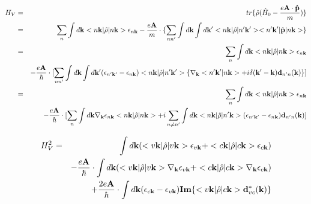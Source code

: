 \documentclass[aps,prb,preprint]{revtex4-1}
\begin{document}
\begin{appendix}
 \begin{eqnarray}
H_V &=& tr\{\hat{\rho}( \hat{H}_0 - \frac{e{\bf A \cdot \hat{p}}}{m}) \} \nonumber \\
&=& \sum_n \int d{\bf k} <n{\bf k}| \hat{\rho} |n{\bf k}> \epsilon_{n{\bf k}} - \frac{e{\bf A}}{m} \cdot \{ \sum_{nn'} \int d{\bf k} \int d{\bf k'} <n{\bf k}| \hat{\rho} |n'{\bf k'}><n'{\bf k'}| \hat{\bf p} |n{\bf k}> \} \nonumber \\
&=& \sum_n \int d{\bf k} <n{\bf k}| \hat{\rho} |n{\bf k}> \epsilon_{n{\bf k}}\nonumber  \\
&& - \frac{e{\bf A}}{\hbar} \cdot [ \sum_{nn'} \int d{\bf k} \int d{\bf k'}  (\epsilon_{n'{\bf k'}}-\epsilon_{n{\bf k}}) <n{\bf k}| \hat{\rho} |n'{\bf k'}>\{\nabla_{\bf k} <n'{\bf k'}|n{\bf k}> + i \delta({\bf k'-k}) {\bf d}_{n'n}({\bf k}) \} ] \nonumber \\
&=& \sum_n \int d{\bf k} <n{\bf k}| \hat{\rho} |n{\bf k}> \epsilon_{n{\bf k}} \nonumber \\
&& - \frac{e{\bf A}}{\hbar} \cdot [ \sum_{n} \int d{\bf k} \nabla_{\bf k} \epsilon_{n{\bf k}} <n{\bf k}| \hat{\rho} |n{\bf k}> + i \sum_{n \neq n'} \int d{\bf k} <n{\bf k}| \hat{\rho} |n'{\bf k}> (\epsilon_{n'{\bf k'}}-\epsilon_{n{\bf k}}) {\bf d}_{n'n}({\bf k})  ] 
\end{eqnarray}

 \begin{eqnarray}
H_V^2 &=& \int d{\bf k} (<v{\bf k}| \hat{\rho} |v{\bf k}> \epsilon_{v{\bf k}}+ <c{\bf k}| \hat{\rho} |c{\bf k}> \epsilon_{c{\bf k}}) \nonumber \\
&& - \frac{e{\bf A}}{\hbar} \cdot \int d{\bf k} ( <v{\bf k}| \hat{\rho} |v{\bf k}> \nabla_{\bf k} \epsilon_{v{\bf k}} + <c{\bf k}| \hat{\rho} |c{\bf k}> \nabla_{\bf k} \epsilon_{c{\bf k}} ) \nonumber \\
&& + \frac{2e{\bf A}}{\hbar} \cdot \int d{\bf k} (\epsilon_{c{\bf k}}-\epsilon_{v{\bf k}}) {\bf Im}\{<v{\bf k}| \hat{\rho} |c{\bf k}> {\bf d}_{vc}^*({\bf k}) \} \nonumber \\
\end{eqnarray}
\fi

\end{appendix}
\end{document}
